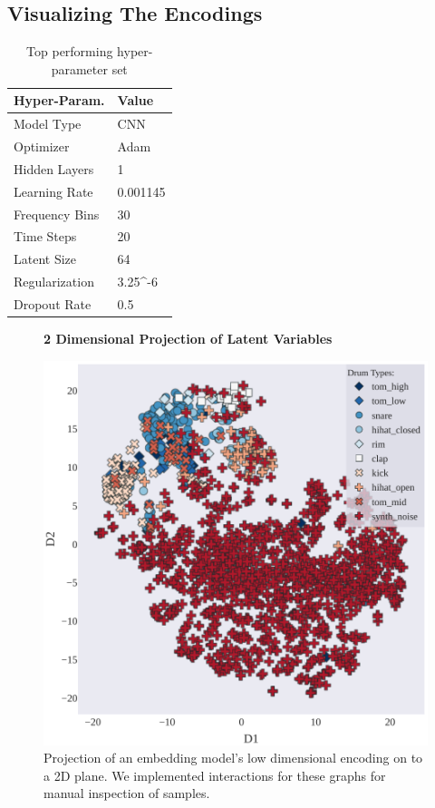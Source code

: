 \documentclass[\main/thesis.tex]{subfiles}
\begin{document}
\subsection{Visualizing The Encodings}
\label{fig:embedding_FE}
\begin{table}[htbp!]
\centering
\begin{tabular}{|p{6cm}|p{6cm}|}
\hline
Hyper-Param. & Value  \\ \hline
Model Type      &  CNN  \\ \hline
Optimizer       & Adam  \\ \hline
Hidden Layers   & 1  \\\hline
Learning Rate   &  0.001145\\ \hline
Frequency Bins & 30 \\ \hline
Time Steps & 20 \\ \hline
Latent Size & 64 \\ \hline
Regularization & 3.25^{-6}\\ \hline
Dropout Rate & 0.5 \\ \hline
\end{tabular}
\caption{Top performing hyper-parameter set}
\label{table:best_params}
\end{table}
\begin{figure}[h!]
\centering
\textbf{2 Dimensional Projection of Latent Variables}\par\medskip
 \includegraphics[width=0.90\linewidth]{images/chapter_3/t-SNE_2d.pdf}
\caption{Projection of an embedding model's low dimensional encoding on to a 2D plane. We implemented interactions for these graphs for manual inspection of samples.}
\label{fig:2d_tsne}
\end{figure}
\end{document}
